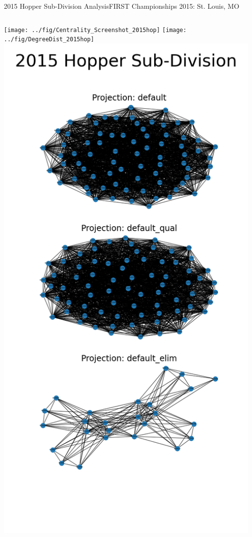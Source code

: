 \documentclass[10pt]{beamer}
\begin{document}
\begin{frame}{2015 Hopper Sub-Division Analysis}{FIRST Championships 2015: St. Louis, MO}
	\begin{columns}
		\texttt{[image: ../fig/Centrality\_Screenshot\_2015hop]}
		\texttt{[image: ../fig/DegreeDist\_2015hop]}
		\includegraphics[height=0.85\textheight]{../fig/NetworkPlot_2015hop}
	\end{columns}
\end{frame}
\end{document}
